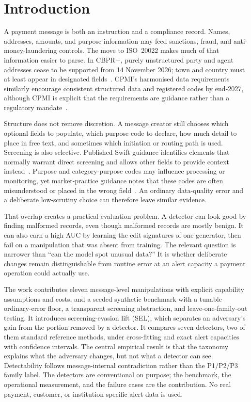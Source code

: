 \documentclass[conference]{IEEEtran}
\begin{document}
\section{Introduction}
A payment message is both an instruction and a compliance record. Names,
addresses, amounts, and purpose information may feed sanctions, fraud, and
anti-money-laundering controls. The move to ISO~20022 makes much of that
information easier to parse. In CBPR+, purely unstructured party and agent
addresses cease to be supported from 14 November 2026; town and country must
at least appear in designated fields~\cite{swift2026addr}. CPMI's harmonised
data requirements similarly encourage consistent structured data and
registered codes by end-2027, although CPMI is explicit that the requirements
are guidance rather than a regulatory mandate~\cite{cpmi2026}.

Structure does not remove discretion. A message creator still chooses which
optional fields to populate, which purpose code to declare, how much detail to
place in free text, and sometimes which initiation or routing path is used.
Screening is also selective. Published Swift guidance identifies elements that
normally warrant direct screening and allows other fields to provide context
instead~\cite{swiftgp2021}. Purpose and category-purpose codes may influence
processing or monitoring, yet market-practice guidance notes that these codes
are often misunderstood or placed in the wrong field~\cite{pmpg2024}. An
ordinary data-quality error and a deliberate low-scrutiny choice can therefore
leave similar evidence.

That overlap creates a practical evaluation problem. A detector can look good
by finding malformed records, even though malformed records are mostly benign.
It can also earn a high AUC by learning the edit signatures of one generator,
then fail on a manipulation that was absent from training. The relevant
question is narrower than ``can the model spot unusual data?'' It is whether
deliberate changes remain distinguishable from routine error at an alert
capacity a payment operation could actually use.

The work contributes eleven message-level manipulations with explicit
capability assumptions and costs, and a seeded synthetic benchmark with a
tunable ordinary-error floor, a transparent screening abstraction, and
leave-one-family-out testing. It introduces screening-evasion lift (SEL),
which separates an adversary's gain from the portion removed by a detector.
It compares seven detectors, two of them standard reference methods, under
cross-fitting and exact alert capacities with confidence intervals. The central empirical
result is that the taxonomy explains what the adversary changes, but not what
a detector can see. Detectability follows message-internal contradiction
rather than the P1/P2/P3 family label. The detectors are conventional on
purpose; the benchmark, the operational measurement, and the failure cases are
the contribution. No real payment, customer, or institution-specific alert
data is used.
\end{document}
